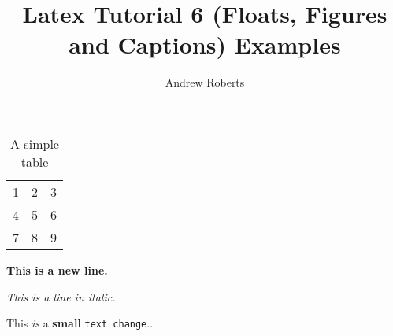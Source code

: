 \documentclass[english]{article}
\begin{document}
\title{Latex Tutorial 6 (Floats, Figures and Captions) Examples}
\author{Andrew Roberts}
\maketitle

\begin{table}[htp]
  \begin{center}
    \begin{tabular}{| l c r |}
    \hline
    1 & 2 & 3 \\
    4 & 5 & 6 \\
    7 & 8 & 9 \\
    \hline
    \end{tabular}
  \end{center}
  \caption{A simple table}
\end{table}

\textbf{This is a new line.}

\textit{This is a line in italic.}

This \emph{is} a \textbf{small} \texttt{text change}..
\end{document}
